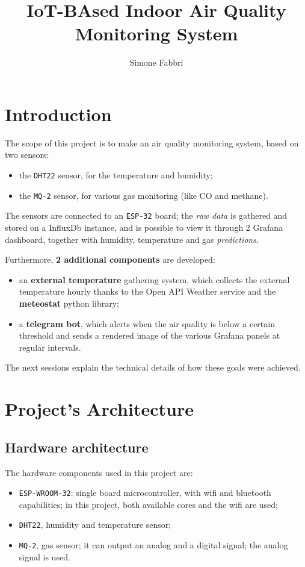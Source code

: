 \documentclass[]{article}
\title{IoT-BAsed Indoor Air Quality Monitoring System}
\author{Simone Fabbri}
\begin{document}
\maketitle

\section{Introduction}
The scope of this project is to make an air quality monitoring system, based on two sensors:
\begin{itemize}
	\item the \texttt{DHT22} sensor, for the temperature and humidity;
	\item the \texttt{MQ-2} sensor, for various gas monitoring (like CO and methane).
\end{itemize}

The sensors are connected to an \texttt{ESP-32} board; the \textit{raw data} is gathered and stored on a InfluxDb instance, and is possible to view it through 2 Grafana dashboard, together with humidity, temperature and gas \textit{predictions}. 

Furthermore, \textbf{2 additional components} are developed:
\begin{itemize}
	\item an \textbf{external temperature} gathering system, which collects the external temperature hourly thanks to the Open API Weather service and the \textbf{meteostat} python library;
	\item a \textbf{telegram bot}, which alerts when the air quality is below a certain threshold and sends a rendered image of the various Grafana panels at regular intervals.
\end{itemize}

The next sessions explain the technical details of how these goals were achieved.

\section{Project's Architecture}
\subsection{Hardware architecture}
The hardware components used in this project are:
\begin{itemize}
	\item \texttt{ESP-WROOM-32}: single board microcontroller, with wifi and bluetooth capabilities; in this project, both available cores and the wifi are used;
	\item \texttt{DHT22}, humidity and temperature sensor;
	\item \texttt{MQ-2}, gas sensor; it can output an analog and a digital signal; the analog signal is used. 
\end{itemize}
\end{document}
